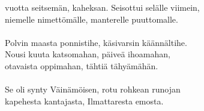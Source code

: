vuotta seitsemän, kaheksan. Seisottui selälle viimein,      \\
niemelle nimettömälle, manterelle puuttomalle.              \\
                                                            \\
Polvin maasta ponnistihe, käsivarsin käännältihe.           \\
Nousi kuuta katsomahan, päiveä ihoamahan,                   \\
otavaista oppimahan, tähtiä tähyämähän.                     \\
                                                            \\
Se oli synty Väinämöisen, rotu rohkean runojan              \\
kapehesta kantajasta, Ilmattaresta emosta.			        		\\
